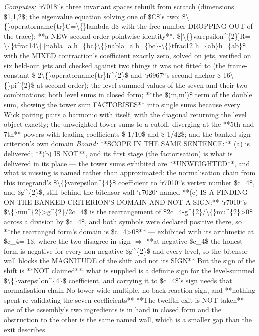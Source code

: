 \begin{description}
\emph{Computes:} `r7018`'s three invariant spaces rebuilt from scratch (dimensions \$1,1,2\$; the eigenvalue equation solving one of \$C\$'s two; \$\textbackslash\{\}operatorname\{tr\}C=\textbackslash\{\}lambda d\$ with the free number DROPPING OUT of the trace); **a NEW second-order pointwise identity**, \$[\textbackslash\{\}varepsilon\textasciicircum{}\{2\}]R=-\textbackslash\{\}tfrac14\textbackslash\{\}nabla\_a h\_\{bc\}\textbackslash\{\}nabla\_a h\_\{bc\}-\textbackslash\{\}tfrac12 h\_\{ab\}h\_\{ab\}\$ with the MIXED contraction's coefficient exactly zero, solved on jets, verified on six held-out jets and checked against two things it was not fitted to (the frame-constant \$-2\textbackslash\{\}operatorname\{tr\}h\textasciicircum{}\{2\}\$ and `r6967`'s second anchor \$-16\textbackslash\{\}pi\textasciicircum{}\{2\}\$ at second order); the level-summed values of the seven and their two combinations; both level sums in closed form; **the \$(m,m')\$ term of the double sum, showing the tower sum FACTORISES** into single sums because every Wick pairing pairs a harmonic with itself, with the diagonal returning the level object exactly; the unweighted tower sums to a cutoff, diverging at the **5th and 7th** powers with leading coefficients \$-1/10\$ and \$-1/42\$; and the banked sign criterion's own domain
 \emph{Bound:}  **SCOPE IN THE SAME SENTENCE:** (a) is delivered; **(b) IS NOT**, and its first stage (the factorisation) is what is delivered in its place --- the tower sums exhibited are **UNWEIGHTED**, and what is missing is named rather than approximated: the normalisation chain from this integrand's \$\textbackslash\{\}varepsilon\textasciicircum{}\{4\}\$ coefficient to `r7010`'s vertex number \$c\_4\$, and \$g\textasciicircum{}\{2\}\$, still behind the bitensor wall `r7020` named  **(c) IS A FINDING ON THE BANKED CRITERION'S DOMAIN AND NOT A SIGN:** `r7010`'s \$\textbackslash\{\}mu\textasciicircum{}\{2\}>g\textasciicircum{}\{2\}/2c\_4\$ is the rearrangement of \$2c\_4-g\textasciicircum{}\{2\}/\textbackslash\{\}mu\textasciicircum{}\{2\}>0\$ across a division by \$c\_4\$, and both symbols were declared positive there, so **the rearranged form's domain is \$c\_4>0\$** --- exhibited with its arithmetic at \$c\_4=-1\$, where the two disagree in sign \ensuremath{\Rightarrow} **at negative \$c\_4\$ the honest form is negative for every non-negative \$g\textasciicircum{}\{2\}\$ and every level, so the bitensor wall blocks the MAGNITUDE of the shift and not its SIGN**  But the sign of the shift is **NOT claimed**: what is supplied is a definite sign for the level-summed \$\textbackslash\{\}varepsilon\textasciicircum{}\{4\}\$ coefficient, and carrying it to \$c\_4\$'s sign needs that normalisation chain  No tower-wide multiple, no back-reaction sign, and **nothing spent re-validating the seven coefficients**  **The twelfth exit is NOT taken** --- one of the assembly's two ingredients is in hand in closed form and the obstruction to the other is the same named wall, which is a smaller gap than the exit describes

\end{description}
